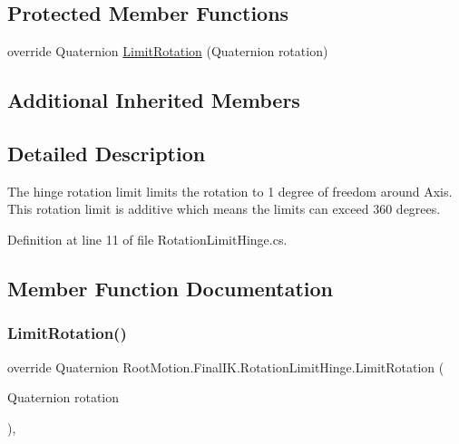 \subsection*{Protected Member Functions}
\begin{DoxyCompactItemize}
\item 
override Quaternion \mbox{\hyperlink{class_root_motion_1_1_final_i_k_1_1_rotation_limit_hinge_aad677e39535e5f9344da8bfbd5bd3388}{Limit\+Rotation}} (Quaternion rotation)
\end{DoxyCompactItemize}
\subsection*{Additional Inherited Members}


\subsection{Detailed Description}
The hinge rotation limit limits the rotation to 1 degree of freedom around Axis. This rotation limit is additive which means the limits can exceed 360 degrees. 



Definition at line 11 of file Rotation\+Limit\+Hinge.\+cs.



\subsection{Member Function Documentation}
\mbox{\label{class_root_motion_1_1_final_i_k_1_1_rotation_limit_hinge_aad677e39535e5f9344da8bfbd5bd3388}} 
\subsubsection{\texorpdfstring{Limit\+Rotation()}{LimitRotation()}}
{\footnotesize\ttfamily override Quaternion Root\+Motion.\+Final\+I\+K.\+Rotation\+Limit\+Hinge.\+Limit\+Rotation (\begin{DoxyParamCaption}\item[{Quaternion}]{rotation }\end{DoxyParamCaption})\hspace{0.3cm}{\ttfamily [protected]}, {\ttfamily [virtual]}}



